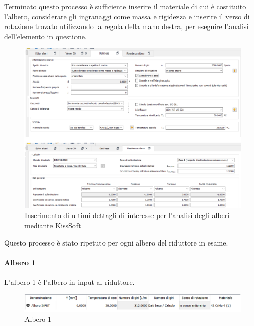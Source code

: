 Terminato questo processo è sufficiente inserire il materiale di cui è costituito l'albero, considerare gli ingranaggi come massa e rigidezza e inserire il verso di rotazione trovato utilizzando la regola della mano destra, per eseguire l'analisi dell'elemento in questione. \begin{figure}[h]
    \centering
    \includegraphics[scale=0.4]{Immagini/MetodologiaAlberi4.png}
    \caption{Inserimento di ultimi dettagli di interesse per l'analisi degli alberi mediante KissSoft}
    \label{fig:MetodologiaAlberi4}
\end{figure}

Questo processo è stato ripetuto per ogni albero del riduttore in esame.
\newpage
\paragraph{Albero 1}
L'albero 1 è l'albero in input al riduttore.
\begin{figure}[h]
    \centering
    \includegraphics[scale=0.45]{Immagini/DatiAlbero1.png}
    \caption{Albero  1}
    \label{fig:DatiAlbero1}
\end{figure}

